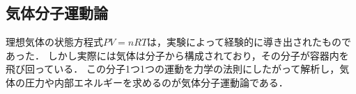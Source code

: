 
\setcounter{nombre}{4}

\subsection{気体分子運動論}

理想気体の状態方程式$PV=nRT$は，実験によって経験的に導き出されたものであった．
しかし実際には気体は分子から構成されており，その分子が容器内を飛び回っている．
{\gtfamily この分子1つ1つの運動を力学の法則にしたがって解析し，気体の圧力や内部エネルギーを求める}のが{\gtfamily 気体分子運動論}である．

